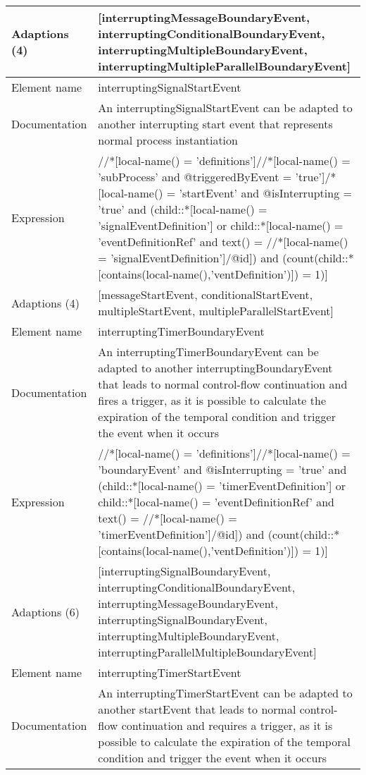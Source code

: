 \begin{center}
\begin{tiny}
\begin{longtable}{p{}|p{}}
\myrowcolour
Adaptions (4) & [interruptingMessageBoundaryEvent, interruptingConditionalBoundaryEvent, interruptingMultipleBoundaryEvent, interruptingMultipleParallelBoundaryEvent]\\
\midrule
Element name & interruptingSignalStartEvent\\
\myrowcolour
Documentation &An interruptingSignalStartEvent can be adapted to another interrupting start event that represents normal process instantiation\\
Expression & //*[local-name() = 'definitions']//*[local-name() = 'subProcess' and @triggeredByEvent = 'true']/*[local-name() = 'startEvent' and @isInterrupting = 'true' and (child::*[local-name() = 'signalEventDefinition'] or child::*[local-name() = 'eventDefinitionRef' and text() = //*[local-name() = 'signalEventDefinition']/@id]) and (count(child::*[contains(local-name(),'ventDefinition')]) = 1)]\\
\myrowcolour
Adaptions (4) & [messageStartEvent, conditionalStartEvent, multipleStartEvent, multipleParallelStartEvent]\\
\midrule
Element name & interruptingTimerBoundaryEvent\\
\myrowcolour
Documentation &An interruptingTimerBoundaryEvent can be adapted to another interruptingBoundaryEvent that leads to normal control-flow continuation and fires a trigger, as it is possible to calculate the expiration of the temporal condition and trigger the event when it occurs\\
Expression & //*[local-name() = 'definitions']//*[local-name() = 'boundaryEvent' and @isInterrupting = 'true' and (child::*[local-name() = 'timerEventDefinition'] or child::*[local-name() = 'eventDefinitionRef' and text() = //*[local-name() = 'timerEventDefinition']/@id]) and (count(child::*[contains(local-name(),'ventDefinition')]) = 1)]\\
\myrowcolour
Adaptions (6) & [interruptingSignalBoundaryEvent, interruptingConditionalBoundaryEvent, interruptingMessageBoundaryEvent, interruptingSignalBoundaryEvent, interruptingMultipleBoundaryEvent, interruptingParallelMultipleBoundaryEvent]\\
\midrule
Element name & interruptingTimerStartEvent\\
\myrowcolour
Documentation &An interruptingTimerStartEvent can be adapted to another startEvent that leads to normal control-flow continuation and requires a trigger, as it is possible to calculate the expiration of the temporal condition and trigger the event when it occurs\\

\end{longtable}
\end{tiny}
\end{center}
